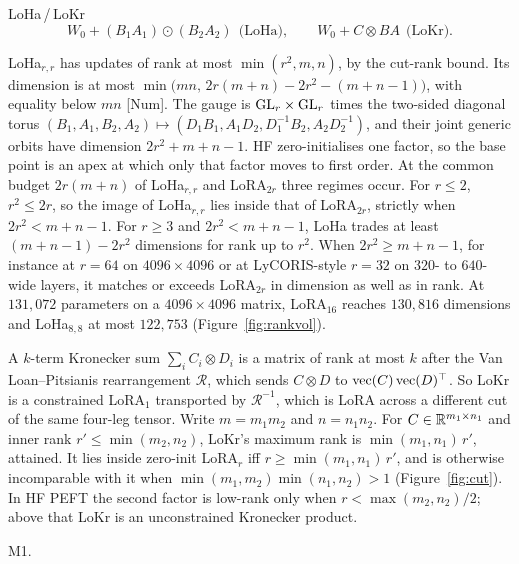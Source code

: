 \begin{example*}{LoHa\,/\,LoKr}\label{ex:loha}%
\[
  W_0+(B_1A_1)\odot(B_2A_2)\ \ \text{(LoHa)},\qquad W_0+C\otimes BA\ \ \text{(LoKr)}.
\]
\begin{exVIIlines}
\item[Image] LoHa$_{r,r}$ has updates of rank at most $\min(r^2,m,n)$, by the cut-rank bound. Its dimension is at most
  $\min\big(mn,\,2r(m+n)-2r^2-(m+n-1)\big)$, with equality below $mn$ [Num]. The gauge is $\mathrm{GL}_r\times\mathrm{GL}_r$ times the
  two-sided diagonal torus $(B_1,A_1,B_2,A_2)\mapsto(D_1B_1,A_1D_2,D_1^{-1}B_2,A_2D_2^{-1})$, and their joint generic
  orbits have dimension $2r^2+m+n-1$. HF zero-initialises one factor, so the base point is an apex at which only that
  factor moves to first order. At the common budget $2r(m+n)$ of LoHa$_{r,r}$ and LoRA$_{2r}$ three regimes occur. For
  $r\le2$, $r^2\le2r$, so the image of LoHa$_{r,r}$ lies inside that of LoRA$_{2r}$, strictly when $2r^2<m+n-1$. For
  $r\ge3$ and $2r^2<m+n-1$, LoHa trades at least $(m+n-1)-2r^2$ dimensions for rank up to $r^2$. When
  $2r^2\ge m+n-1$, for instance at $r=64$ on $4096\times4096$ or at LyCORIS-style $r=32$ on $320$- to $640$-wide
  layers, it matches or exceeds LoRA$_{2r}$ in dimension as well as in rank. At $131{,}072$ parameters on a
  $4096\times4096$ matrix, LoRA$_{16}$ reaches $130{,}816$ dimensions and LoHa$_{8,8}$ at most $122{,}753$
  (Figure~\ref{fig:rankvol}).
\item[Image] A $k$-term Kronecker sum $\sum_iC_i\otimes D_i$ is a matrix of rank at most $k$ after the Van
  Loan--Pitsianis rearrangement $\mathcal R$, which sends $C\otimes D$ to $\operatorname{vec}(C)\operatorname{vec}(D)^{\top}$. So LoKr is a
  constrained LoRA$_1$ transported by $\mathcal R^{-1}$, which is LoRA across a different cut of the same four-leg
  tensor. Write $m=m_1m_2$ and $n=n_1n_2$. For $C\in\mathbb{R}^{m_1\times n_1}$ and inner rank $r'\le\min(m_2,n_2)$, LoKr's
  maximum rank is $\min(m_1,n_1)\,r'$, attained. It lies inside zero-init LoRA$_r$ iff $r\ge\min(m_1,n_1)\,r'$, and
  is otherwise incomparable with it when $\min(m_1,m_2)\min(n_1,n_2)>1$ (Figure~\ref{fig:cut}). In HF PEFT the second
  factor is low-rank only when $r<\max(m_2,n_2)/2$; above that LoKr is an unconstrained Kronecker product.
\item[Merge] M1.
\end{exVIIlines}
\end{example*}

